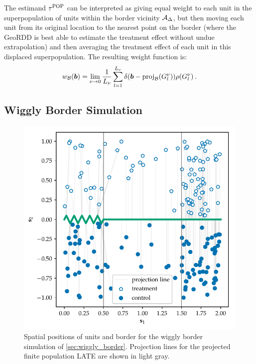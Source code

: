 	The estimand \(\tau^{\mathrm{POP}}\) can be interpreted as giving equal weight to each unit in the superpopulation of units within the border vicinity \(\mathcal{A}_\Delta\), but then moving each unit from its original location to the nearest point on the border (where the GeoRDD is best able to estimate the treatment effect without undue extrapolation) and then averaging the treatment effect of each unit in this displaced superpopulation.
The resulting weight function is:
\begin{equation}
    \weightb(\sentinel) = 
		\lim_{\gridres \rightarrow 0}
		\frac{1}{L_\gridres}
		\sum_{l=1}^{L_\gridres}
			\delta\del{\sentinel - \proj_{\border}\del{\grid_l} } 
			\rho(\grid_l) 
		\,.
\end{equation}

\subsection{Wiggly Border Simulation}
\label{sec:wiggly_border}

\begin{figure}[tb]
\centering
\includegraphics[height=0.35\textheight]{figures/wiggly_boundaries_setup.pdf}
\caption{
	\label{fig:wiggly_boundaries_setup}
	Spatial positions of units and border for the wiggly border simulation of \autoref{sec:wiggly_border}. Projection lines for the projected finite population LATE are shown in light gray.}
\end{figure}
    

